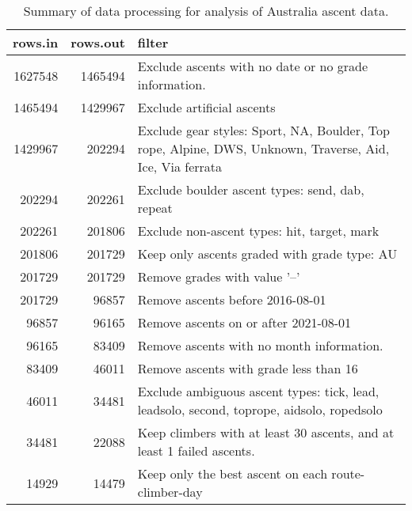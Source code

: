 \begin{table}[ht]
\centering
\begingroup\fontsize{9pt}{10pt}\selectfont
\begin{tabular}{rrl}
  \hline
{\bf rows.in} & {\bf rows.out} & {\bf filter} \\ 
  \hline
1627548 & 1465494 & Exclude ascents with no date or no grade information. \\ 
  1465494 & 1429967 & Exclude artificial ascents \\ 
  1429967 & 202294 & Exclude gear styles: Sport, NA, Boulder, Top rope, Alpine, DWS, Unknown, Traverse, Aid, Ice, Via ferrata \\ 
  202294 & 202261 & Exclude boulder ascent types: send, dab, repeat \\ 
  202261 & 201806 & Exclude non-ascent types: hit, target, mark \\ 
  201806 & 201729 & Keep only ascents graded with grade type: AU \\ 
  201729 & 201729 & Remove grades with value '--' \\ 
  201729 & 96857 & Remove ascents before 2016-08-01 \\ 
  96857 & 96165 & Remove ascents on or after 2021-08-01 \\ 
  96165 & 83409 & Remove ascents with no month information. \\ 
  83409 & 46011 & Remove ascents with grade less than 16 \\ 
  46011 & 34481 & Exclude ambiguous ascent types: tick, lead, leadsolo, second, toprope, aidsolo, ropedsolo \\ 
  34481 & 22088 & Keep climbers with at least 30 ascents, and at least 1 failed ascents. \\ 
  14929 & 14479 & Keep only the best ascent on each route-climber-day \\ 
   \hline
\end{tabular}
\endgroup
\caption{Summary of data processing for analysis of Australia ascent data.} 
\label{table-data-processing-aus}
\end{table}
